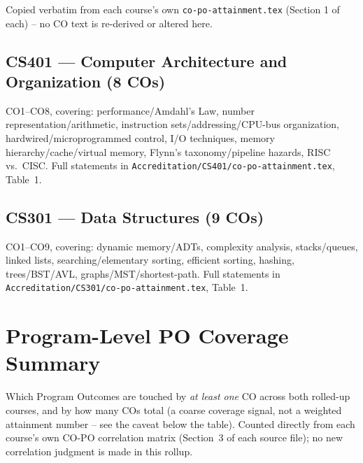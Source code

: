 \documentclass[11pt]{article}
\begin{document}
Copied verbatim from each course's own \texttt{co-po-attainment.tex} (Section 1 of each) -- no CO text is re-derived or altered here.

\subsection{CS401 --- Computer Architecture and Organization (8 COs)}
CO1--CO8, covering: performance/Amdahl's Law, number representation/arithmetic, instruction sets/addressing/CPU-bus organization, hardwired/microprogrammed control, I/O techniques, memory hierarchy/cache/virtual memory, Flynn's taxonomy/pipeline hazards, RISC vs.\ CISC. Full statements in \texttt{Accreditation/CS401/co-po-attainment.tex}, Table~1.

\subsection{CS301 --- Data Structures (9 COs)}
CO1--CO9, covering: dynamic memory/ADTs, complexity analysis, stacks/queues, linked lists, searching/elementary sorting, efficient sorting, hashing, trees/BST/AVL, graphs/MST/shortest-path. Full statements in \texttt{Accreditation/CS301/co-po-attainment.tex}, Table~1.

\section{Program-Level PO Coverage Summary}
\label{sec:coverage}

Which Program Outcomes are touched by \emph{at least one} CO across both rolled-up courses, and by how many COs total (a coarse coverage signal, not a weighted attainment number -- see the caveat below the table). Counted directly from each course's own CO-PO correlation matrix (Section~3 of each source file); no new correlation judgment is made in this rollup.
\end{document}
